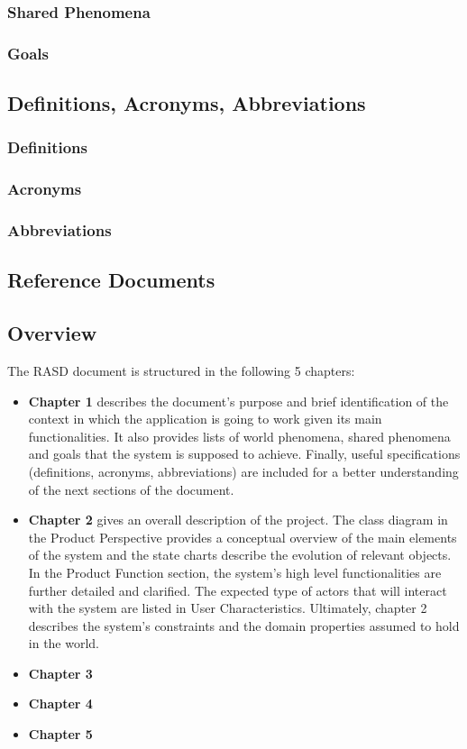 \documentclass{article}
\begin{document}
\subsubsection{Shared Phenomena}
\subsubsection{Goals}

\subsection{Definitions, Acronyms, Abbreviations}
\subsubsection{Definitions}
\subsubsection{Acronyms}
\subsubsection{Abbreviations}

\subsection{Reference Documents}
\subsection{Overview}
The RASD document is structured in the following 5 chapters:
\begin{itemize}
\item\textbf{Chapter 1} describes the document’s purpose and brief identification of the context in which the application is going to work given its main functionalities. It also provides lists of world phenomena, shared phenomena and goals that the system is supposed to achieve. Finally, useful specifications (definitions, acronyms, abbreviations) are included for a better understanding of the next sections of the document.
\item\textbf{Chapter 2} gives an overall description of the project. The class diagram in the Product Perspective provides a conceptual overview of the main elements of the system and the state charts describe the evolution of relevant objects. In the Product Function section, the system’s high level functionalities are further detailed and clarified. The expected type of actors that will interact with the system are listed in User Characteristics. Ultimately, chapter 2 describes the system’s constraints and the domain properties assumed to hold in the world.
\item\textbf{Chapter 3}
\item\textbf{Chapter 4}
\item\textbf{Chapter 5}
\end{itemize}
\end{document}
